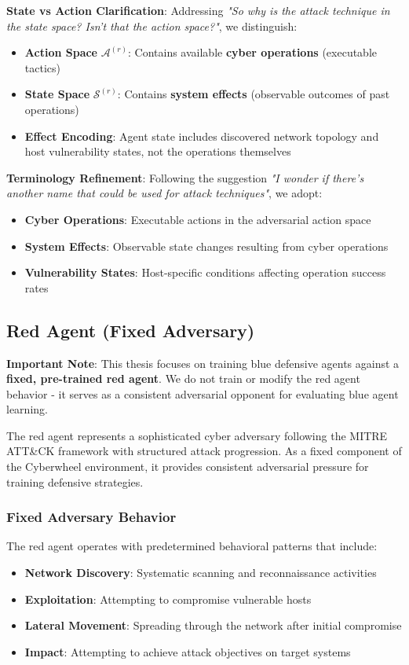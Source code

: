 \documentclass[12pt,twoside]{article}
\begin{document}
\textbf{State vs Action Clarification}: Addressing \textit{"So why is the attack technique in the state space? Isn't that the action space?"}, we distinguish:
\begin{itemize}
\item \textbf{Action Space} $\mathcal{A}^{(r)}$: Contains available \textbf{cyber operations} (executable tactics)
\item \textbf{State Space} $\mathcal{S}^{(r)}$: Contains \textbf{system effects} (observable outcomes of past operations)  
\item \textbf{Effect Encoding}: Agent state includes discovered network topology and host vulnerability states, not the operations themselves
\end{itemize}

\textbf{Terminology Refinement}: Following the suggestion \textit{"I wonder if there's another name that could be used for attack techniques"}, we adopt:
\begin{itemize}
\item \textbf{Cyber Operations}: Executable actions in the adversarial action space
\item \textbf{System Effects}: Observable state changes resulting from cyber operations
\item \textbf{Vulnerability States}: Host-specific conditions affecting operation success rates
\end{itemize}

\subsection{Red Agent (Fixed Adversary)}

\textbf{Important Note}: This thesis focuses on training blue defensive agents against a \textbf{fixed, pre-trained red agent}. We do not train or modify the red agent behavior - it serves as a consistent adversarial opponent for evaluating blue agent learning.

The red agent represents a sophisticated cyber adversary following the MITRE ATT\&CK framework with structured attack progression. As a fixed component of the Cyberwheel environment, it provides consistent adversarial pressure for training defensive strategies.

\subsubsection{Fixed Adversary Behavior}
The red agent operates with predetermined behavioral patterns that include:
\begin{itemize}
\item \textbf{Network Discovery}: Systematic scanning and reconnaissance activities
\item \textbf{Exploitation}: Attempting to compromise vulnerable hosts
\item \textbf{Lateral Movement}: Spreading through the network after initial compromise
\item \textbf{Impact}: Attempting to achieve attack objectives on target systems
\end{itemize}
\end{document}
